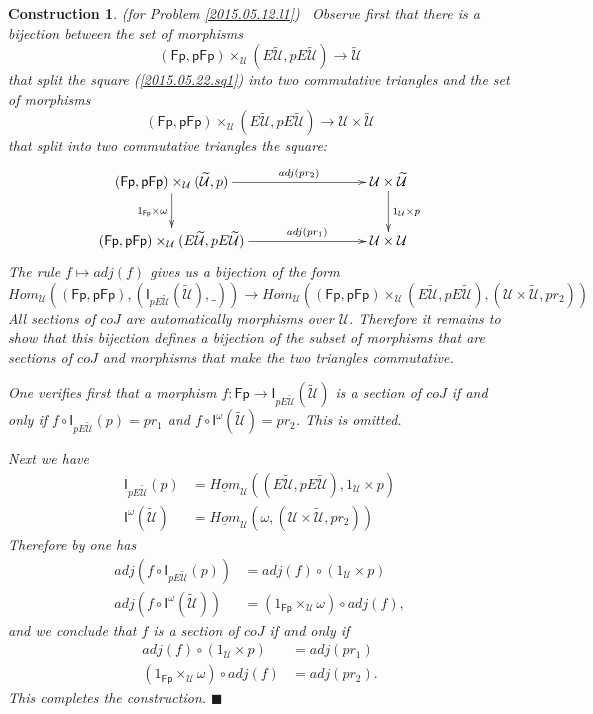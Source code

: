 \documentclass[12pt]{article}
\numberwithin{equation}{section}
\newtheorem{construction0}[proposition]{Construction}
\newenvironment{construction}[1]{\begin{construction0}(for Problem \ref{#1})\ }{$\blacksquare$ \end{construction0}}
\newcommand{\llabel}[1]{\label{#1}}
\newcommand{\sr}{\rightarrow}
\newcommand{\uu}{\underline}
\newcommand{\iHom}{\uu{Hom}}
\newcommand{\wt}{\widetilde}
\newcommand{\id}{1}            %
\newcommand{\U}{\mathcal{U}}
\newcommand{\I}{\mathsf{I}}
\newcommand{\Fp}{\mathsf{Fp}}
\newcommand{\pFp}{\mathsf{pFp}}
\begin{document}
%
\begin{construction}{2015.05.12.l1}\rm
\llabel{2015.05.22.constr1} Observe first that there is a bijection between the
set of morphisms
%
$$(\Fp,\pFp)\times_\U(E\wt{\U},pE\wt{\U})\sr \wt{\U}$$
%
that split the square (\ref{2015.05.22.sq1}) into two commutative triangles and
the set of morphisms
%
$$(\Fp,\pFp)\times_\U(E\wt{\U},pE\wt{\U})\sr \U\times\wt{\U}$$
%
that split into two commutative triangles the square:
%
$$
\begin{xy}
          \xymatrix@C=7pc{ (\Fp,\pFp)\times_\U(\wt{\U},p) \ar[r]^-{adj(pr_2)}
            \ar[d]_{\id_{\Fp}\times \omega} & \U\times \wt{\U} \ar[d]^{\id_\U\times
              p}\\ (\Fp,\pFp)\times_\U(E\wt{\U},pE\wt{\U}) \ar[r]^-{adj(pr_1)} &
            \U\times \U }
\end{xy}
$$
%
The rule $f\mapsto adj(f)$ gives us a bijection of the form
%
$$Hom_\U((\Fp,\pFp),(\I_{pE\wt{\U}}(\wt{\U}),\_))\sr Hom_\U((\Fp,\pFp)\times_\U
(E\wt{\U},pE\wt{\U}), (\U\times\wt{\U}, pr_2))$$
%
All sections of $coJ$ are automatically morphisms over $\U$. Therefore it
remains to show that this bijection defines a bijection of the subset of
morphisms that are sections of $coJ$ and morphisms that make the two triangles
commutative.

One verifies first that a morphism $f:\Fp\sr \I_{pE\wt{\U}}(\wt{\U})$ is a section
of $coJ$ if and only if $f\circ \I_{pE\wt{\U}}(p)=pr_1$ and $f\circ
\I^{\omega}(\wt{\U})=pr_2$. This is omitted.

Next we have
%
\begin{align*}
  \I_{pE\wt{\U}}(p)&=\iHom_\U((E\wt{\U},pE\wt{\U}),\id_\U\times p) \\
  \I^{\omega}(\wt{\U})&=\iHom_\U(\omega,(\U\times\wt{\U},pr_2))
\end{align*}
%
Therefore by \cite[Lemma 8.7]{fromunivwithPi} one has
%
\begin{align*}
  adj(f\circ \I_{pE\wt{\U}}(p))&=adj(f)\circ (\id_\U\times p) \\
  adj(f\circ \I^{\omega}(\wt{\U}))&=(\id_{\Fp}\times_{\U}\omega)\circ adj(f),
\end{align*}
%
and we conclude that $f$ is a section of $coJ$ if and only if
%
\begin{align*}
  adj(f)\circ (\id_\U\times p)&=adj(pr_1) \\
  (\id_{\Fp}\times_{\U}\omega)\circ adj(f)&=adj(pr_2).
\end{align*}
% 
This completes the construction.
\end{construction}
\end{document}
